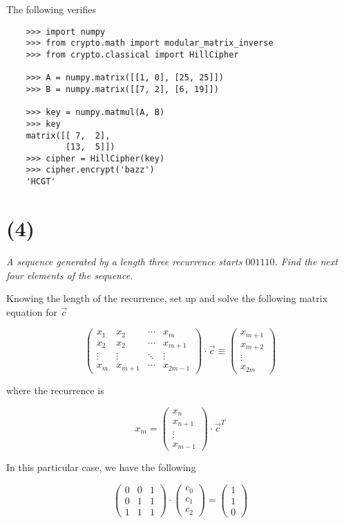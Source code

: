 \documentclass[12pt]{article}
\begin{document}
    The following verifies

    \begin{verbatim}
    >>> import numpy
    >>> from crypto.math import modular_matrix_inverse
    >>> from crypto.classical import HillCipher

    >>> A = numpy.matrix([[1, 0], [25, 25]])
    >>> B = numpy.matrix([[7, 2], [6, 19]])

    >>> key = numpy.matmul(A, B)
    >>> key
    matrix([[ 7,  2],
            [13,  5]])
    >>> cipher = HillCipher(key)
    >>> cipher.encrypt('bazz')
    'HCGT'
    \end{verbatim}

\section*{(4)} \textit{A sequence generated by a length three recurrence starts $001110$. Find the next four elements of the sequence.}

    Knowing the length of the recurrence, set up and solve the following matrix equation for $\vec{c}$

    $$\begin{pmatrix}x_1 & x_2 & \cdots & x_m \\ x_2 & x_2 & \cdots & x_{m+1} \\ \vdots & \vdots & \ddots & \vdots \\ x_m & x_{m+1} & \cdots & x_{2m - 1}\end{pmatrix} \cdot \vec{c} \equiv \begin{pmatrix}x_{m+1} \\ x_{m+2} \\ \vdots \\ x_{2m}\end{pmatrix}$$

    where the recurrence is

    $$x_m = \begin{pmatrix}x_{n} \\ x_{n + 1} \\ \vdots \\ x_{m - 1}\end{pmatrix} \cdot \vec{c}^T$$

    In this particular case, we have the following

    $$\begin{pmatrix}0 & 0 & 1 \\ 0 & 1 & 1 \\ 1 & 1 & 1\end{pmatrix}\cdot\begin{pmatrix}c_0 \\ c_1 \\ c_2\end{pmatrix} = \begin{pmatrix}1 \\ 1 \\ 0\end{pmatrix}$$
\end{document}
